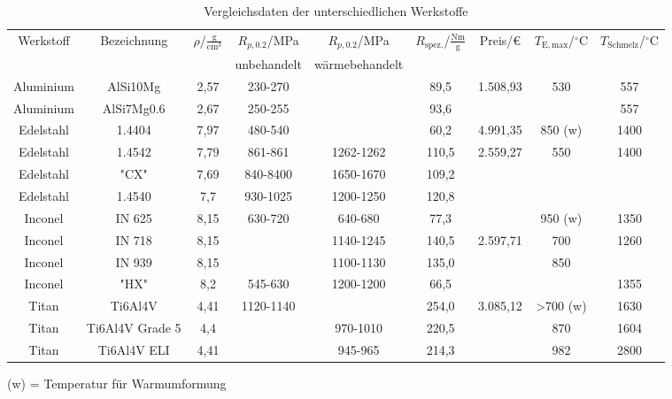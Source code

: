 \begin{landscape}
\begin{table}[h]
	\centering
	\caption{Vergleichsdaten der unterschiedlichen Werkstoffe}
	\label{tab_Werkstoffe} 
	\begin{tabular}{|c|c|c|c|c|c|c|c|c|}
		\hline
		Werkstoff&Bezeichnung&$\rho$/$\frac{\mathrm{g}}{\mathrm{cm}^3}$&$R_{p,0.2}$/MPa&$R_{p,0.2}$/MPa&$R_\mathrm{spez.}$/$\frac{\mathrm{Nm}}{\mathrm{g}}$&Preis/€&$T_\mathrm{E, max}$/$^\circ$C&$T_\mathrm{Schmelz}$/$^\circ$C\\
		&&&unbehandelt&wärmebehandelt&&&&\\
		\hline \hline
		Aluminium&AlSi10Mg&2,57&230-270&&89,5&1.508,93&530&557\\
		Aluminium&AlSi7Mg0.6&2,67&250-255&&93,6&&&557\\
		\hline
		Edelstahl&1.4404&7,97&480-540&&60,2&4.991,35&850 (w)&1400\\
		Edelstahl&1.4542&7,79&861-861&1262-1262&110,5&2.559,27&550&1400\\
		Edelstahl&"CX"&7,69&840-8400&1650-1670&109,2&&&\\
		Edelstahl&1.4540&7,7&930-1025&1200-1250&120,8&&&\\
		\hline
		Inconel&IN 625&8,15&630-720&640-680&77,3&&950 (w)&1350\\
		Inconel&IN 718&8,15&&1140-1245&140,5&2.597,71&700&1260\\
		Inconel&IN 939&8,15&&1100-1130&135,0&&850&\\
		Inconel&"HX"&8,2&545-630&1200-1200&66,5&&&1355\\
		\hline
		Titan&Ti6Al4V&4,41&1120-1140&&254,0&3.085,12&>700 (w)&1630\\
		Titan&Ti6Al4V Grade 5&4,4&&970-1010&220,5&&870&1604\\
		Titan&Ti6Al4V ELI&4,41&&945-965&214,3&&982&2800\\
		\hline
	\end{tabular}
	\begin{flushright}
	\end{flushright}
\end{table}
(w) = Temperatur für Warmumformung
\end{landscape}